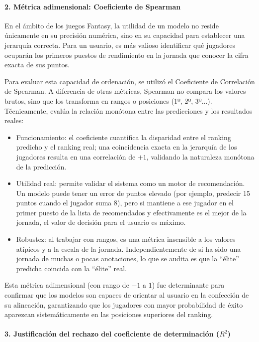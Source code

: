 \paragraph{2. Métrica adimensional: Coeficiente de Spearman}
 
En el ámbito de los juegos Fantasy, la utilidad de un modelo no reside únicamente en su precisión numérica, sino en su capacidad para establecer una
jerarquía correcta. Para un usuario, es más valioso identificar qué jugadores ocuparán los primeros puestos de rendimiento en la jornada que conocer la cifra exacta de sus puntos.
 
Para evaluar esta capacidad de ordenación, se utilizó el Coeficiente de Correlación de Spearman. A diferencia de otras métricas, Spearman no compara
los valores brutos, sino que los transforma en rangos o posiciones (1º, 2º, 3º...). Técnicamente, evalúa la relación monótona entre las predicciones y los resultados reales:
 
\begin{itemize}
\item Funcionamiento: el coeficiente cuantifica la disparidad entre el ranking predicho y el ranking real; una coincidencia exacta en la jerarquía de los jugadores resulta en una correlación de $+1$, validando la naturaleza monótona de la predicción.
 
\item Utilidad real: permite validar el sistema como un motor de recomendación. Un modelo puede tener un error de puntos elevado (por ejemplo, predecir 15 puntos cuando el jugador suma 8), pero si mantiene a ese jugador en el primer puesto de la lista de recomendados y efectivamente es el mejor de la jornada, el valor de decisión para el usuario es máximo.
 
\item Robustez: al trabajar con rangos, es una métrica insensible a los valores atípicos y a la escala de la jornada. Independientemente de si ha sido una jornada de muchas o pocas anotaciones, lo que se audita es que la ``élite'' predicha coincida con la ``élite'' real.
\end{itemize}
 
Esta métrica adimensional (con rango de $-1$ a $1$) fue determinante para confirmar que los modelos son capaces de orientar al usuario en la confección
de su alineación, garantizando que los jugadores con mayor probabilidad de éxito aparezcan sistemáticamente en las posiciones superiores del ranking.
 
\paragraph{3. Justificación del rechazo del coeficiente de determinación ($R^2$)}
 
